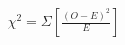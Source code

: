 \documentclass[preview]{standalone}
\begin{document}
\begin{align*}
\chi^2 = \Sigma\left[\frac{(O - E)^2}{E}\right]
\end{align*}
\end{document}
